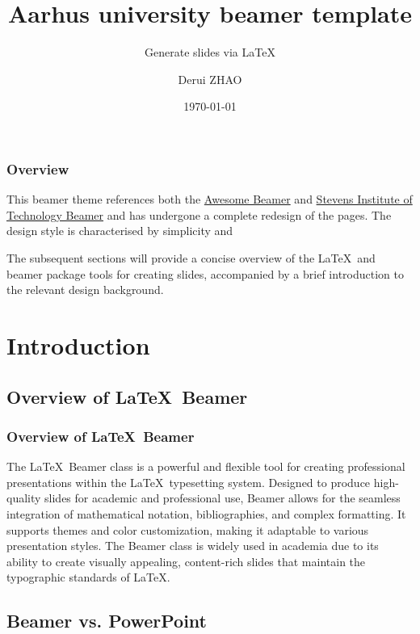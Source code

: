 \documentclass[aspectratio=1610]{beamer}
\title{Aarhus university beamer template}
\subtitle{Generate slides via \LaTeX}
\author{Derui ZHAO}
\date{\today}
\begin{document}
\frame{\titlepage}

\begin{frame}
    \frametitle{Overview}
    This beamer theme references both the \href{https://github.com/LukasPietzschmann/awesome-beamer}{Awesome Beamer} and \href{https://github.com/ProofLabs/StevensBeamerLatexTemplate}{Stevens Institute of Technology Beamer} and has undergone a complete redesign of the pages. The design style is characterised by simplicity and

    The subsequent sections will provide a concise overview of the \LaTeX\ and beamer package tools for creating slides, accompanied by a brief introduction to the relevant design background.
\end{frame}

\section{Introduction}

\subsection{Overview of \LaTeX\ Beamer}

\begin{frame}
    \frametitle{Overview of \LaTeX\ Beamer}
    The \LaTeX\ Beamer class is a powerful and flexible tool for creating professional presentations within the \LaTeX\ typesetting system. Designed to produce high-quality slides for academic and professional use, Beamer allows for the seamless integration of mathematical notation, bibliographies, and complex formatting. It supports themes and color customization, making it adaptable to various presentation styles. The Beamer class is widely used in academia due to its ability to create visually appealing, content-rich slides that maintain the typographic standards of \LaTeX.
\end{frame}

\subsection{Beamer vs. PowerPoint}
\end{document}
